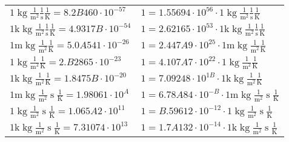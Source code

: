 \begin{center}
\begin{longtable}{l l}
{\color{black}$1 \bm{\mathrm{ }}\operatorname{kg}\frac1{\operatorname{m}^2}\frac1{\operatorname{s}}{}\frac1{\operatorname{K}} = 8.2B460\cdot10^{-57} $}   & {\color{black}$ 1 = 1.55694\cdot10^{56} \cdot 1 \bm{\mathrm{ }}\operatorname{kg}\frac1{\operatorname{m}^2}\frac1{\operatorname{s}}{}\frac1{\operatorname{K}}$}  \\
{\color{gray}$1 \bm{\mathrm{ k}}\operatorname{kg}\frac1{\operatorname{m}^2}\frac1{\operatorname{s}}{}\frac1{\operatorname{K}} = 4.9317B\cdot10^{-54} $}   & {\color{gray}$ 1 = 2.62165\cdot10^{53} \cdot 1 \bm{\mathrm{ k}}\operatorname{kg}\frac1{\operatorname{m}^2}\frac1{\operatorname{s}}{}\frac1{\operatorname{K}}$}  \\
{\color{gray}$1 \bm{\mathrm{ m}}\operatorname{kg}\frac1{\operatorname{m}^2}{}{}\frac1{\operatorname{K}} = 5.0A541\cdot10^{-26} $}   & {\color{gray}$ 1 = 2.447A9\cdot10^{25} \cdot 1 \bm{\mathrm{ m}}\operatorname{kg}\frac1{\operatorname{m}^2}{}{}\frac1{\operatorname{K}}$}  \\
{\color{black}$1 \bm{\mathrm{ }}\operatorname{kg}\frac1{\operatorname{m}^2}{}{}\frac1{\operatorname{K}} = 2.B2865\cdot10^{-23} $}   & {\color{black}$ 1 = 4.107A7\cdot10^{22} \cdot 1 \bm{\mathrm{ }}\operatorname{kg}\frac1{\operatorname{m}^2}{}{}\frac1{\operatorname{K}}$}  \\
{\color{gray}$1 \bm{\mathrm{ k}}\operatorname{kg}\frac1{\operatorname{m}^2}{}{}\frac1{\operatorname{K}} = 1.8475B\cdot10^{-20} $}   & {\color{gray}$ 1 = 7.09248\cdot10^{1B} \cdot 1 \bm{\mathrm{ k}}\operatorname{kg}\frac1{\operatorname{m}^2}{}{}\frac1{\operatorname{K}}$}  \\
{\color{gray}$1 \bm{\mathrm{ m}}\operatorname{kg}\frac1{\operatorname{m}^2}{\operatorname{s}}{}\frac1{\operatorname{K}} = 1.98061\cdot10^{A} $}   & {\color{gray}$ 1 = 6.78A84\cdot10^{-B} \cdot 1 \bm{\mathrm{ m}}\operatorname{kg}\frac1{\operatorname{m}^2}{\operatorname{s}}{}\frac1{\operatorname{K}}$}  \\
{\color{black}$1 \bm{\mathrm{ }}\operatorname{kg}\frac1{\operatorname{m}^2}{\operatorname{s}}{}\frac1{\operatorname{K}} = 1.065A2\cdot10^{11} $}   & {\color{black}$ 1 = B.59612\cdot10^{-12} \cdot 1 \bm{\mathrm{ }}\operatorname{kg}\frac1{\operatorname{m}^2}{\operatorname{s}}{}\frac1{\operatorname{K}}$}  \\
{\color{gray}$1 \bm{\mathrm{ k}}\operatorname{kg}\frac1{\operatorname{m}^2}{\operatorname{s}}{}\frac1{\operatorname{K}} = 7.31074\cdot10^{13} $}   & {\color{gray}$ 1 = 1.7A132\cdot10^{-14} \cdot 1 \bm{\mathrm{ k}}\operatorname{kg}\frac1{\operatorname{m}^2}{\operatorname{s}}{}\frac1{\operatorname{K}}$}  \\

\end{longtable}
\end{center}

